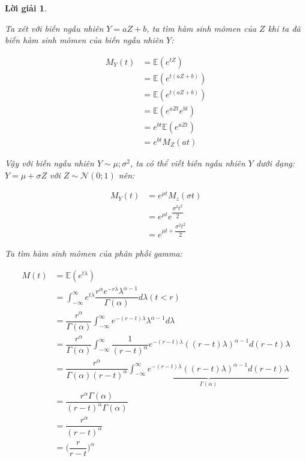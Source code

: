 \documentclass[14pt, a4paper]{article}
\theoremstyle{sltheorem}
\theoremstyle{soltheorem}
\newtheorem*{loigiai}{Lời giải}
\begin{document}
\begin{loigiai}
\begin{enumerate}
        Ta xét với biến ngẫu nhiên $Y = aZ + b$, ta tìm hàm sinh mômen của $Z$ khi ta đã biến hàm sinh mômen của biến ngẫu nhiên $Y$:

        \begin{equation*}
            \begin{aligned}
                M_Y (t) &= \mathbb{E} (e^{tZ}) \\
                &= \mathbb{E} (e^{t(aZ + b)}) \\
                &= \mathbb{E} (e^{t(aZ + b)}) \\
                &= \mathbb{E} (e^{aZt}e^{bt}) \\
                &= e^{bt} \mathbb{E}(e^{aZt}) \\
                &= e^{bt} M_Z(at)
            \end{aligned}
        \end{equation*}

        Vậy với biến ngẫu nhiên $Y \sim \mathcal{\mu; \sigma^2}$, ta có thể viết biến ngẫu nhiên $Y$ dưới dạng: $Y = \mu + \sigma Z$ với $Z \sim \mathcal{N}(0;1)$ nên:

        \begin{equation*}
            \begin{aligned}
                M_Y(t) &= e^{\mu t} M_z(\sigma t) \\
                &= e^{\mu t} e^{\dfrac{\sigma^2 t^2}{2}} \\
                &= e^{\mu t + \dfrac{\sigma^2 t^2}{2}}
            \end{aligned}
        \end{equation*}

        Ta tìm hàm sinh mômen của phân phối gamma:

        \begin{equation*}
            \begin{aligned}
                M(t) &= \mathbb{E}(e^{t\lambda}) \\
                &= \int_{-\infty}^{\infty} e^{t\lambda} \dfrac{r^{\alpha}e^{-r\lambda} \lambda^{\alpha-1}}{\Gamma(\alpha)} d\lambda (t < r) \\
                &= \dfrac{r^{\alpha}}{\Gamma(\alpha)} \int_{-\infty}^{\infty} e^{-(r-t)\lambda} \lambda^{\alpha-1} d \lambda \\
                &= \dfrac{r^{\alpha}}{\Gamma(\alpha)} \int_{-\infty}^{\infty} \dfrac{1}{(r-t)^{\alpha}} e^{-(r-t)\lambda} ((r-t)\lambda)^{\alpha-1} d (r-t)\lambda \\
                &= \dfrac{r^{\alpha}}{\Gamma(\alpha)(r-t)^{\alpha}} \underbrace{\int_{-\infty}^{\infty} e^{-(r-t)\lambda} ((r-t)\lambda)^{\alpha-1} d (r-t)\lambda}_{\Gamma(\alpha)} \\
                &= \dfrac{r^{\alpha} \Gamma(\alpha)}{(r-t)^{\alpha}\Gamma(\alpha)} \\
                &= \dfrac{r^{\alpha}}{(r-t)^{\alpha}} \\
                &= \Big( \dfrac{r}{r-t} \Big)^{\alpha}
            \end{aligned}
        \end{equation*}


\end{enumerate}
\end{loigiai}
\end{document}
